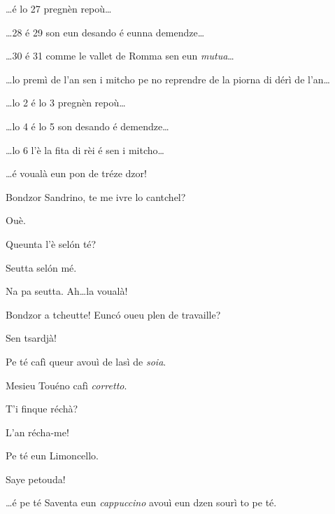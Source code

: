 \begin{drama}
\Richardspeaks \ldots é lo 27 pregnèn repoù\ldots

\Gerominespeaks \ldots 28 é 29 son eun desando é eunna demendze\ldots

\Saventaspeaks \ldots 30 é 31 comme le vallet de Romma sen eun \textit{mutua}\ldots

\Spritzspeaks \ldots lo premì de l’an sen i mitcho pe no reprendre de la piorna di dérì de l'an\ldots

\Tuenospeaks \ldots lo 2 é lo 3 pregnèn repoù\ldots

\Richardspeaks \ldots lo 4 é lo 5 son desando é demendze\ldots

\Gerominespeaks \ldots lo 6 l'è la fita di rèi é sen i mitcho\ldots

\Tcheutte \ldots é voualà eun pon de tréze dzor!


\Baristaspeaks Bondzor Sandrino, te me ivre lo cantchel?

\Sandrinospeaks Ouè.


\Sandrinospeaks{} Queunta l'è sel\'on té?

\Baristaspeaks{} Seutta sel\'on mé.

\Sandrinospeaks Na pa seutta. Ah\ldots la voualà!


\Baristaspeaks Bondzor a tcheutte! Eunc\'o oueu plen de travaille?

\Gerominespeaks Sen tsardjà!


\Baristaspeaks{} Pe té cafì queur avouì de lasì de \textit{soia}.

\Baristaspeaks{} Mesieu Touéno cafì \textit{corretto}.

\Baristaspeaks{} T'i finque réchà? 

\Spritzspeaks L'an récha-me!

\Baristaspeaks Pe té eun Limoncello.

\Spritzspeaks Saye petouda!

\Baristaspeaks{} \ldots é pe té Saventa eun \textit{cappuccino} avouì eun dzen sourì to pe té.


\end{drama}
